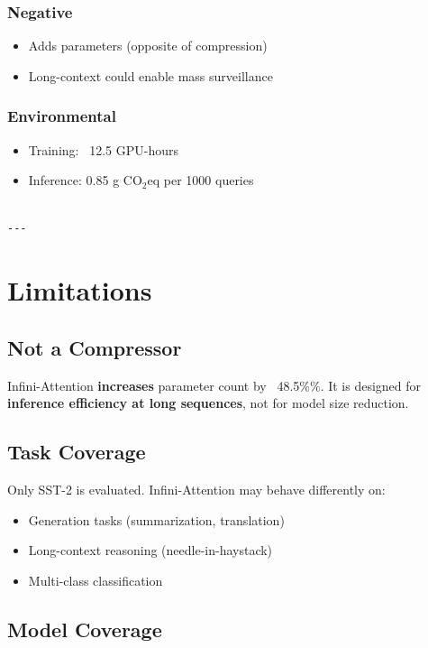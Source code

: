 \subsubsection{Negative}
\begin{itemize}
\item Adds parameters (opposite of compression)
\item Long-context could enable mass surveillance

\end{itemize}
\subsubsection{Environmental}
\begin{itemize}
\item Training: ~12.5 GPU-hours
\item Inference: 0.85 g CO$_2$eq per 1000 queries
\end{itemize}
\begin{lstlisting}

---
\end{lstlisting}


\section{Limitations}

\subsection{Not a Compressor}

Infini-Attention \textbf{increases} parameter count by ~48.5\%\%. It is 
designed for \textbf{inference efficiency at long sequences}, not for model 
size reduction.

\subsection{Task Coverage}

Only SST-2 is evaluated. Infini-Attention may behave differently on:

\begin{itemize}
\item Generation tasks (summarization, translation)
\item Long-context reasoning (needle-in-haystack)
\item Multi-class classification

\end{itemize}
\subsection{Model Coverage}

